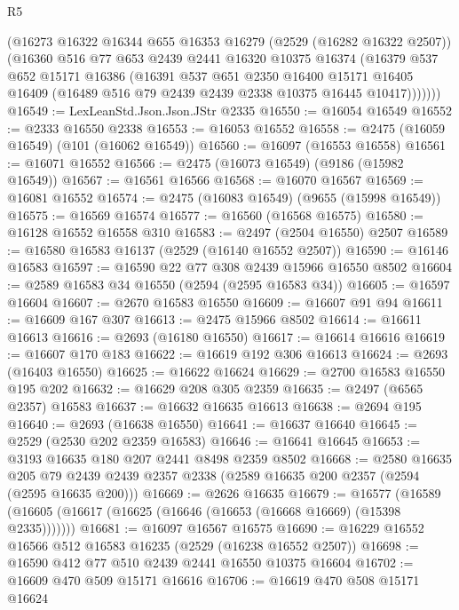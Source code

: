 \begin{lexlean}{R5}
\begin{coremodule}
        (@16273
          @16322
          @16344
          @655
          @16353
          @16279
          (@2529 (@16282 @16322 @2507))
          (@16360
            @516
            @77
            @653
            @2439
            @2441
            @16320
            @10375
            @16374
            (@16379
              @537
              @652
              @15171
              @16386
              (@16391
                @537
                @651
                @2350
                @16400
                @15171
                @16405
                @16409
                (@16489 @516 @79 @2439 @2439 @2338 @10375 @16445 @10417)))))))
@16549 := LexLeanStd.Json.Json.JStr @2335
@16550 := @16054 @16549
@16552 := @2333 @16550 @2338
@16553 := @16053 @16552
@16558 := @2475 (@16059 @16549) (@101 (@16062 @16549))
@16560 := @16097 (@16553 @16558)
@16561 := @16071 @16552
@16566 := @2475 (@16073 @16549) (@9186 (@15982 @16549))
@16567 := @16561 @16566
@16568 := @16070 @16567
@16569 := @16081 @16552
@16574 := @2475 (@16083 @16549) (@9655 (@15998 @16549))
@16575 := @16569 @16574
@16577 := @16560 (@16568 @16575)
@16580 := @16128 @16552 @16558 @310
@16583 := @2497 (@2504 @16550) @2507
@16589 := @16580 @16583 @16137 (@2529 (@16140 @16552 @2507))
@16590 := @16146 @16583
@16597 := @16590 @22 @77 @308 @2439 @15966 @16550 @8502
@16604 := @2589 @16583 @34 @16550 (@2594 (@2595 @16583 @34))
@16605 := @16597 @16604
@16607 := @2670 @16583 @16550
@16609 := @16607 @91 @94
@16611 := @16609 @167 @307
@16613 := @2475 @15966 @8502
@16614 := @16611 @16613
@16616 := @2693 (@16180 @16550)
@16617 := @16614 @16616
@16619 := @16607 @170 @183
@16622 := @16619 @192 @306 @16613
@16624 := @2693 (@16403 @16550)
@16625 := @16622 @16624
@16629 := @2700 @16583 @16550 @195 @202
@16632 := @16629 @208 @305 @2359
@16635 := @2497 (@6565 @2357) @16583
@16637 := @16632 @16635 @16613
@16638 := @2694 @195
@16640 := @2693 (@16638 @16550)
@16641 := @16637 @16640
@16645 := @2529 (@2530 @202 @2359 @16583)
@16646 := @16641 @16645
@16653 := @3193 @16635 @180 @207 @2441 @8498 @2359 @8502
@16668 := @2580
    @16635
    @205
    @79
    @2439
    @2439
    @2357
    @2338
    (@2589 @16635 @200 @2357 (@2594 (@2595 @16635 @200)))
@16669 := @2626 @16635
@16679 := @16577
    (@16589 (@16605 (@16617 (@16625 (@16646 (@16653 (@16668 @16669) (@15398 @2335)))))))
@16681 := @16097 @16567 @16575
@16690 := @16229 @16552 @16566 @512 @16583 @16235 (@2529 (@16238 @16552 @2507))
@16698 := @16590 @412 @77 @510 @2439 @2441 @16550 @10375 @16604
@16702 := @16609 @470 @509 @15171 @16616
@16706 := @16619 @470 @508 @15171 @16624

\end{coremodule}
\end{lexlean}

